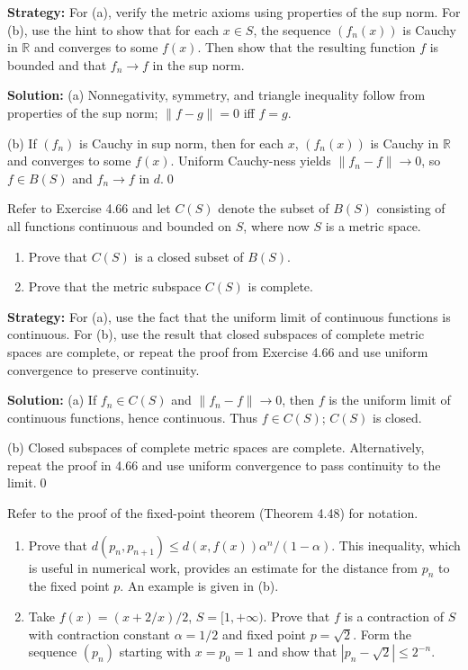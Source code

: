 \noindent\textbf{Strategy:} For (a), verify the metric axioms using properties of the sup norm. For (b), use the hint to show that for each $x \in S$, the sequence $(f_n(x))$ is Cauchy in $\mathbb{R}$ and converges to some $f(x)$. Then show that the resulting function $f$ is bounded and that $f_n \to f$ in the sup norm.

\bigskip\noindent\textbf{Solution:}
(a) Nonnegativity, symmetry, and triangle inequality follow from properties of the sup norm; $\|f-g\|=0$ iff $f=g$.

(b) If $(f_n)$ is Cauchy in sup norm, then for each $x$, $(f_n(x))$ is Cauchy in $\mathbb{R}$ and converges to some $f(x)$. Uniform Cauchy-ness yields $\|f_n-f\|\to 0$, so $f\in B(S)$ and $f_n\to f$ in $d$.\qed



\begin{problembox}
Refer to Exercise 4.66 and let $C(S)$ denote the subset of $B(S)$ consisting of all functions continuous and bounded on $S$, where now $S$ is a metric space.
\begin{enumerate}[label=(\alph*)]
\item Prove that $C(S)$ is a closed subset of $B(S)$.
\item Prove that the metric subspace $C(S)$ is complete.
\end{enumerate}
\end{problembox}

\noindent\textbf{Strategy:} For (a), use the fact that the uniform limit of continuous functions is continuous. For (b), use the result that closed subspaces of complete metric spaces are complete, or repeat the proof from Exercise 4.66 and use uniform convergence to preserve continuity.

\bigskip\noindent\textbf{Solution:}
(a) If $f_n\in C(S)$ and $\|f_n-f\|\to 0$, then $f$ is the uniform limit of continuous functions, hence continuous. Thus $f\in C(S)$; $C(S)$ is closed.

(b) Closed subspaces of complete metric spaces are complete. Alternatively, repeat the proof in 4.66 and use uniform convergence to pass continuity to the limit.\qed



\begin{problembox}
Refer to the proof of the fixed-point theorem (Theorem 4.48) for notation.
\begin{enumerate}[label=(\alph*)]
\item Prove that $d(p_n, p_{n+1}) \leq d(x, f(x)) \alpha^n / (1 - \alpha)$. This inequality, which is useful in numerical work, provides an estimate for the distance from $p_n$ to the fixed point $p$. An example is given in (b).
\item Take $f(x) = (x + 2/x)/2$, $S = [1, +\infty)$. Prove that $f$ is a contraction of $S$ with contraction constant $\alpha = 1/2$ and fixed point $p = \sqrt{2}$. Form the sequence $(p_n)$ starting with $x=p_0=1$ and show that $|p_n - \sqrt{2}| \le 2^{-n}$.
\end{enumerate}
\end{problembox}

